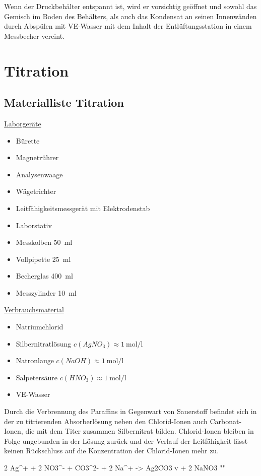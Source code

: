 		Wenn der Druckbehälter entspannt ist, wird er vorsichtig geöffnet und sowohl das Gemisch im Boden des Behälters, als auch das Kondensat an
		seinen Innenwänden durch Abspülen mit VE-Wasser mit dem Inhalt der Entlüftungsstation in einem Messbecher vereint.
	\section{Titration}\label{sec:titration}
		\subsection*{Materialliste Titration}
			\underline{Laborgeräte}
			\begin{itemize}
				\item Bürette
				\item Magnetrührer
				\item Analysenwaage
				\item Wägetrichter
				\item Leitfähigkeitsmessgerät mit Elektrodenstab
				\item Laborstativ
				\item Messkolben \SI{50}{\milli\litre}
				\item Vollpipette \SI{25}{\milli\litre}
				\item Becherglas \SI{400}{\milli\litre}
				\item Messzylinder \SI{10}{\milli\litre}
			\end{itemize}

			\underline{Verbrauchsmaterial}
			\begin{itemize}
				\item Natriumchlorid
				\item Silbernitratlösung \(c(AgNO_3) \approx \SI{1}{\mole\per\litre}\)
				\item Natronlauge \(c(NaOH) \approx \SI{1}{\mole\per\litre}\)
				\item Salpetersäure \(c(HNO_3) \approx \SI{1}{\mole\per\litre}\)
				\item VE-Wasser
			\end{itemize}
		Durch die Verbrennung des Paraffins in Gegenwart von Sauerstoff befindet sich in der zu titrierenden Absorberlösung neben den Chlorid-Ionen
		auch Carbonat-Ionen, die mit dem Titer zusammen Silbernitrat bilden. Chlorid-Ionen bleiben in Folge ungebunden in der Lösung zurück
		und der Verlauf der Leitfähigkeit lässt keinen Rückschluss auf die Konzentration der Chlorid-Ionen mehr zu.
		\begin{reaction}
			2 Ag^+ + 2 NO3^- + CO3^{2-} + 2 Na^+ -> Ag2CO3 v + 2 NaNO3 "\label{re:silbercarbonat bildung}"
		\end{reaction}

